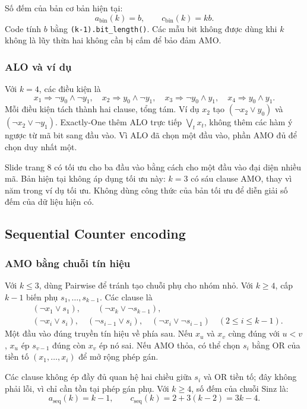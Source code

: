 Số đếm của bản cơ bản hiện tại:
\begin{equation}
a_{\mathrm{bin}}(k)=b,\qquad c_{\mathrm{bin}}(k)=kb.
\end{equation}
Code tính $b$ bằng \texttt{(k-1).bit\_length()}. Các mẫu bit không được dùng khi $k$ không là lũy thừa hai không cần bị cấm để bảo đảm AMO.

\subsubsection{ALO và ví dụ}
Với $k=4$, các điều kiện là
\[
x_1\Rightarrow\neg y_0\land\neg y_1,\quad
x_2\Rightarrow y_0\land\neg y_1,\quad
x_3\Rightarrow\neg y_0\land y_1,\quad
x_4\Rightarrow y_0\land y_1.
\]
Mỗi điều kiện tách thành hai clause, tổng tám. Ví dụ $x_2$ tạo $(\neg x_2\lor y_0)$ và $(\neg x_2\lor\neg y_1)$. Exactly-One thêm ALO trực tiếp $\bigvee_t x_t$, không thêm các hàm ý ngược từ mã bit sang đầu vào. Vì ALO đã chọn một đầu vào, phần AMO đủ để chọn duy nhất một.

Slide trang 8 \citep{amoSlides} có tối ưu cho ba đầu vào bằng cách cho một đầu vào đại diện nhiều mã. Bản hiện tại không áp dụng tối ưu này: $k=3$ có sáu clause AMO, thay vì năm trong ví dụ tối ưu. Không dùng công thức của bản tối ưu để diễn giải số đếm của dữ liệu hiện có.

\subsection{Sequential Counter encoding}
\subsubsection{AMO bằng chuỗi tín hiệu}
Với $k\le3$, dùng Pairwise để tránh tạo chuỗi phụ cho nhóm nhỏ. Với $k\ge4$, cấp $k-1$ biến phụ $s_1,\ldots,s_{k-1}$. Các clause là
\begin{align}
&(\neg x_1\lor s_1),\qquad
(\neg x_k\lor\neg s_{k-1}),\nonumber\\
&(\neg x_i\lor s_i),\quad
(\neg s_{i-1}\lor s_i),\quad
(\neg x_i\lor\neg s_{i-1})
\quad(2\le i\le k-1).
\label{eq:seq}
\end{align}
Một đầu vào đúng truyền tín hiệu về phía sau. Nếu $x_u$ và $x_v$ cùng đúng với $u<v$, $x_u$ ép $s_{v-1}$ đúng còn $x_v$ ép nó sai. Nếu AMO thỏa, có thể chọn $s_i$ bằng OR của tiền tố $(x_1,\ldots,x_i)$ để mở rộng phép gán.

Các clause không ép đầy đủ quan hệ hai chiều giữa $s_i$ và OR tiền tố; đây không phải lỗi, vì chỉ cần tồn tại phép gán phụ. Với $k\ge4$, số đếm của chuỗi Sinz \citep{sinz2005} là:
\begin{equation}
a_{\mathrm{seq}}(k)=k-1,\qquad
c_{\mathrm{seq}}(k)=2+3(k-2)=3k-4.
\end{equation}

